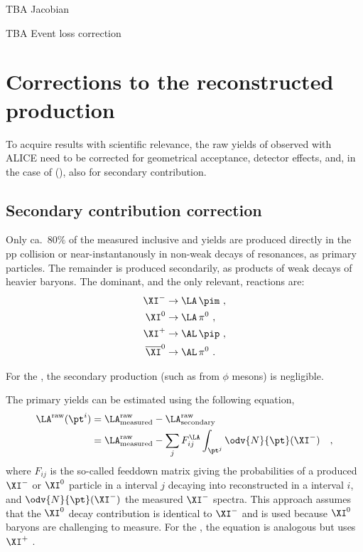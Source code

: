 TBA Jacobian

TBA Event loss correction

\section{Corrections to the reconstructed production}

To acquire results with scientific relevance, the raw yields of \VOs observed with ALICE need to be corrected for geometrical acceptance, detector effects, and, in the case of \LA(\AL), also for secondary contribution.

\subsection{Secondary contribution correction}

Only ca.\ $80\%$ of the measured inclusive \LA and \AL yields are produced directly in the pp collision or near-instantanously in non-weak decays of resonances, as primary particles. The remainder is produced secondarily, as products of weak decays of heavier baryons. The dominant, and the only relevant, reactions are:
\begin{align}
\XI^- &\rightarrow \LA \, \pim \, \, , \\
\XI^0 &\rightarrow \LA \, \pi^0 \, \, ,\\
\XI^+ &\rightarrow \AL \, \pip \, \, ,\\
\overline{\XI}^0 &\rightarrow \AL \, \pi^0 \, \, .
\end{align}

For the \KOs, the secondary production (such as from $\phi$ mesons) is negligible.

The primary \LA yields can be estimated using the following equation,
\begin{align}
\LA^\mathrm{raw}_\mathrm{
} (\pt^i ) &= \LA^\mathrm{raw}_\mathrm{measured} - \LA^\mathrm{raw}_\mathrm{secondary}  \, \, \\
&= \LA^\mathrm{raw}_\mathrm{measured} - \sum_j F_{ij}^\LA \int_{\pt^j} \odv{N}{\pt} (\XI^-) \quad ,
\end{align}
where $F_{ij}$ is the so-called feeddown matrix giving the probabilities of a produced $\XI^-$ or $\XI^0$ particle in a \pt interval $j$ decaying into reconstructed \LA in a \pt interval $i$, and $\odv{N}{\pt} (\XI^-)$ the measured $\XI^-$ spectra.  This approach assumes that the $\XI^0$ decay contribution is identical to $\XI^-$ and is used because $\XI^0$ baryons are challenging to measure. For the \AL , the equation is analogous but uses $\XI^+$ .

